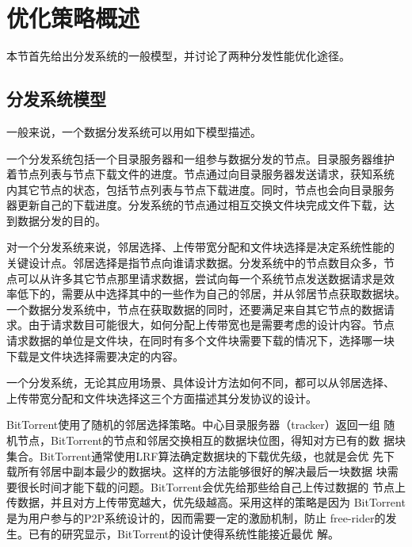 
\section{优化策略概述}
\label{sec:btmethod}

本节首先给出分发系统的一般模型，并讨论了两种分发性能优化途径。

\subsection{分发系统模型}

一般来说，一个数据分发系统可以用如下模型描述。

一个分发系统包括一个目录服务器和一组参与数据分发的节点。目录服务器维护
着节点列表与节点下载文件的进度。节点通过向目录服务器发送请求，获知系统
内其它节点的状态，包括节点列表与节点下载进度。同时，节点也会向目录服务
器更新自己的下载进度。分发系统的节点通过相互交换文件块完成文件下载，达
到数据分发的目的。


对一个分发系统来说，邻居选择、上传带宽分配和文件块选择是决定系统性能的
关键设计点。邻居选择是指节点向谁请求数据。分发系统中的节点数目众多，节
点可以从许多其它节点那里请求数据，尝试向每一个系统节点发送数据请求是效
率低下的，需要从中选择其中的一些作为自己的邻居，并从邻居节点获取数据块。
一个数据分发系统中，节点在获取数据的同时，还要满足来自其它节点的数据请
求。由于请求数目可能很大，如何分配上传带宽也是需要考虑的设计内容。节点
请求数据的单位是文件块，在同时有多个文件块需要下载的情况下，选择哪一块
下载是文件块选择需要决定的内容。

一个分发系统，无论其应用场景、具体设计方法如何不同，都可以从邻居选择、
上传带宽分配和文件块选择这三个方面描述其分发协议的设计。

BitTorrent使用了随机的邻居选择策略。中心目录服务器（tracker）返回一组
随机节点，BitTorrent的节点和邻居交换相互的数据块位图，得知对方已有的数
据块集合。BitTorrent通常使用LRF算法确定数据块的下载优先级，也就是会优
先下载所有邻居中副本最少的数据块。这样的方法能够很好的解决最后一块数据
块需要很长时间才能下载的问题。BitTorrent会优先给那些给自己上传过数据的
节点上传数据，并且对方上传带宽越大，优先级越高。采用这样的策略是因为
BitTorrent是为用户参与的P2P系统设计的，因而需要一定的激励机制，防止
free-rider的发生。已有的研究显示，BitTorrent的设计使得系统性能接近最优
解。

